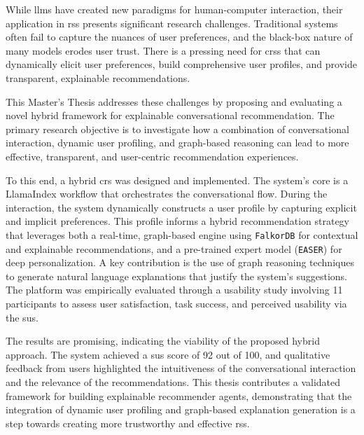 
While \acp{llm} have created new paradigms for human-computer interaction, their application in \acp{rs} presents significant research challenges. Traditional systems often fail to capture the nuances of user preferences, and the black-box nature of many models erodes user trust. There is a pressing need for \aclp{crs} that can dynamically elicit user preferences, build comprehensive user profiles, and provide transparent, explainable recommendations.

This Master's Thesis addresses these challenges by proposing and evaluating a novel hybrid framework for explainable conversational recommendation. The primary research objective is to investigate how a combination of conversational interaction, dynamic user profiling, and graph-based reasoning can lead to more effective, transparent, and user-centric recommendation experiences.

To this end, a hybrid \acl{crs} was designed and implemented. The system's core is a LlamaIndex workflow that orchestrates the conversational flow. During the interaction, the system dynamically constructs a user profile by capturing explicit and implicit preferences. This profile informs a hybrid recommendation strategy that leverages both a real-time, graph-based engine using \texttt{FalkorDB} for contextual and explainable recommendations, and a pre-trained expert model (\texttt{EASER}) for deep personalization. A key contribution is the use of graph reasoning techniques to generate natural language explanations that justify the system's suggestions. The platform was empirically evaluated through a usability study involving 11 participants to assess user satisfaction, task success, and perceived usability via the \ac{sus}.

The results are promising, indicating the viability of the proposed hybrid approach. The system achieved a \acs{sus} score of 92 out of 100, and qualitative feedback from users highlighted the intuitiveness of the conversational interaction and the relevance of the recommendations. This thesis contributes a validated framework for building explainable recommender agents, demonstrating that the integration of dynamic user profiling and graph-based explanation generation is a step towards creating more trustworthy and effective \aclp{rs}.

